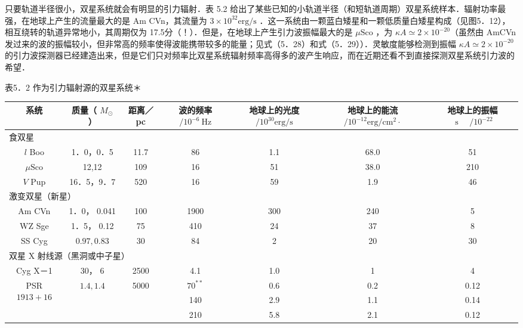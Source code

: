 只要轨道半径很小，双星系统就会有明显的引力辐射．表 5.2 给出了某些已知的小轨道半径（和短轨道周期）双星系统样本．辐射功率最强，在地球上产生的流量最大的是 Am CVn，其流量为 $3 \times 10^{32} \mathrm{erg} / \mathrm{s}$ ．这一系统由一颗蓝白矮星和一颗低质量白矮星构成（见图5．12），相互绕转的轨道异常地小，其周期仅为 17.5分（！）．但是，在地球上产生引力波振幅最大的是 $\mu \mathrm{Sco}$ ，为 $\kappa A \simeq 2 \times 10^{-20}$（虽然由 AmCVn 发过来的波的振幅较小，但非常高的频率使得波能携带较多的能量；见式（5．28）和式（5．29））．灵敏度能够检测到振幅 $\kappa A \simeq 2 \times 10^{-20}$ 的引力波探测器已经建造出来，但是它们只对频率比双星系统辐射频率高得多的波产生响应，而在近期还看不到直接探测双星系统引力波的希望．

表5．2 作为引力辐射源的双星系统＊

\begin{center}
	\begin{tabular}{|c|c|c|c|c|c|c|}
		\hline
		系统 & 质量（ $M_{\odot}$ ） & 距离／pc & 波的频率 \( / 10^{-6} \mathrm{~Hz} \) & 地球上的光度 \( / 10^{30} \mathrm{erg} / \mathrm{s} \) & 地球上的能流 $/ 10^{-12} \mathrm{erg} / \mathrm{cm}^{2} \cdot$ & 地球上的振幅 \( \text { s } \quad / 10^{-22} \) \\
		\hline
		\multicolumn{7}{|l|}{食双星} \\
		\hline
		$l$ Boo & 1．0，0．5 & 11.7 & 86 & 1.1 & 68.0 & 51 \\
		\hline
		$\mu \mathrm{Sco}$ & 12,12 & 109 & 16 & 51 & 38.0 & 210 \\
		\hline
		$V$ Pup & 16．5，9．7 & 520 & 16 & 59 & 1.9 & 46 \\
		\hline
		\multicolumn{7}{|l|}{激变双星（新星）} \\
		\hline
		Am CVn & 1．0， 0.041 & 100 & 1900 & 300 & 240 & 5 \\
		\hline
		WZ Sge & 1．5， 0.12 & 75 & 410 & 24 & 37 & 8 \\
		\hline
		SS Cyg & $0.97,0.83$ & 30 & 84 & 2 & 20 & 30 \\
		\hline
		\multicolumn{7}{|l|}{双星 X 射线源（黑洞或中子星）} \\
		\hline
		Cyg X－1 & 30， 6 & 2500 & 4.1 & 1.0 & 1 & 4 \\
		\hline
		\multirow[t]{3}{*}{PSR $1913+16$} & $1.4,1.4$ & 5000 & $70^{* *}$ & 0.6 & 0.2 & 0.12 \\
		\hline
		&  &  & 140 & 2.9 & 1.1 & 0.14 \\
		\hline
		&  &  & 210 & 5.8 & 2.1 & 0.12 \\
		\hline
	\end{tabular}
\end{center}

